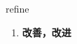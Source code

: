 
\begin{frame}
{\huge refine}
\begin{center}
\begin{enumerate}\Large
  \item \textbf{改善，改进}
\end{enumerate}
\end{center}
\end{frame}
